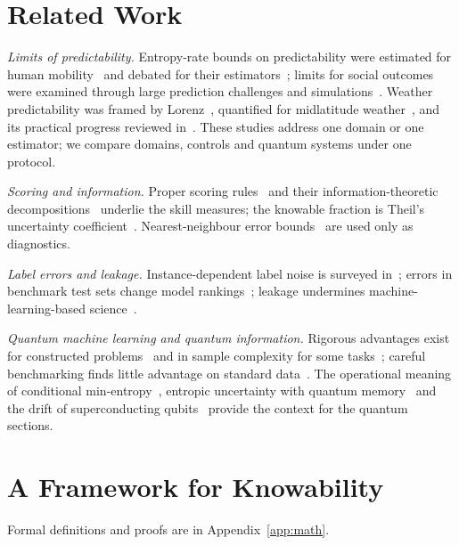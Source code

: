 \documentclass[journal]{IEEEtran}
\theoremstyle{definition}
\begin{document}
\section{Related Work}\label{sec:related}
\emph{Limits of predictability.} Entropy-rate bounds on predictability were estimated for human mobility~\cite{song2010limits} and debated for their estimators~\cite{xu2019predictability}; limits for social outcomes were examined through large prediction challenges and simulations~\cite{salganik2020measuring,martin2016exploring,hofman2017prediction}. Weather predictability was framed by Lorenz~\cite{lorenz1969predictability}, quantified for midlatitude weather~\cite{zhang2019predictability}, and its practical progress reviewed in~\cite{bauer2015quiet}. These studies address one domain or one estimator; we compare domains, controls and quantum systems under one protocol.

\emph{Scoring and information.} Proper scoring rules~\cite{gneiting2007strictly,brier1950verification} and their information-theoretic decompositions~\cite{weijs2010kl,roulston2002evaluating} underlie the skill measures; the knowable fraction is Theil's uncertainty coefficient~\cite{theil1970estimation}. Nearest-neighbour error bounds~\cite{cover1967nearest,hellman1970probability} are used only as diagnostics.

\emph{Label errors and leakage.} Instance-dependent label noise is surveyed in~\cite{frenay2014survey,song2023learning}; errors in benchmark test sets change model rankings~\cite{northcutt2021pervasive}; leakage undermines machine-learning-based science~\cite{kapoor2023leakage}.

\emph{Quantum machine learning and quantum information.} Rigorous advantages exist for constructed problems~\cite{liu2021rigorous} and in sample complexity for some tasks~\cite{huang2021information}; careful benchmarking finds little advantage on standard data~\cite{bowles2024better}. The operational meaning of conditional min-entropy~\cite{konig2009operational}, entropic uncertainty with quantum memory~\cite{berta2010uncertainty} and the drift of superconducting qubits~\cite{klimov2018fluctuations,burnett2019decoherence,carroll2022dynamics,proctor2020detecting} provide the context for the quantum sections.

\section{A Framework for Knowability}\label{sec:framework}
Formal definitions and proofs are in Appendix~\ref{app:math}.
\end{document}
